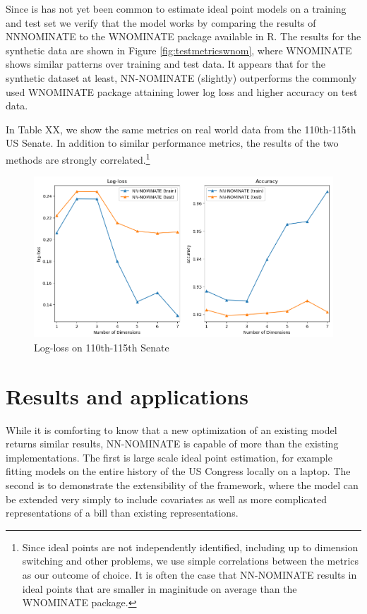\documentclass[11pt,]{article}
\begin{document}
Since is has not yet been common to estimate ideal point models on a
training and test set we verify that the model works by comparing the
results of NNNOMINATE to the WNOMINATE package available in R. The
results for the synthetic data are shown in Figure
\ref{fig:testmetricswnom}, where WNOMINATE shows similar patterns over
training and test data. It appears that for the synthetic dataset at
least, NN-NOMINATE (slightly) outperforms the commonly used WNOMINATE
package attaining lower log loss and higher accuracy on test data.

In Table XX, we show the same metrics on real world data from the
110th-115th US Senate. In addition to similar performance metrics, the
results of the two methods are strongly correlated.\footnote{Since ideal
  points are not independently identified, including up to dimension
  switching and other problems, we use simple correlations between the
  metrics as our outcome of choice. It is often the case that
  NN-NOMINATE results in ideal points that are smaller in maginitude on
  average than the WNOMINATE package.}

\begin{figure}

{\centering \includegraphics[width=0.75\linewidth]{votes_metrics} 

}

\caption{\label{fig:votesmetrics}Log-loss on 110th-115th Senate}\label{fig:unnamed-chunk-6}
\end{figure}

\section{Results and applications}\label{results-and-applications}

While it is comforting to know that a new optimization of an existing
model returns similar results, NN-NOMINATE is capable of more than the
existing implementations. The first is large scale ideal point
estimation, for example fitting models on the entire history of the US
Congress locally on a laptop. The second is to demonstrate the
extensibility of the framework, where the model can be extended very
simply to include covariates as well as more complicated representations
of a bill than existing representations.
\end{document}
